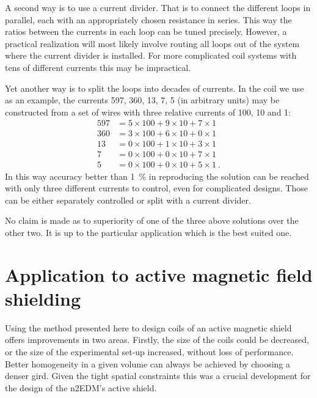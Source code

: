 A second way is to use a current divider. That is to connect the different loops in parallel, each with an appropriately chosen resistance in series. This way the ratios between the currents in each loop can be tuned precisely. However, a practical realization will most likely involve routing all loops out of the system where the current divider is installed. For more complicated coil systems with tens of different currents this may be impractical.

Yet another way is to split the loops into decades of currents.
In the coil we use as an example, the currents \num{597}, \num{360}, \num{13}, \num{7}, \num{5} (in arbitrary units) may be constructed from a set of wires with three relative currents of \num{100}, \num{10} and \num{1}:
\begin{align*}
  597 & = 5 \times 100 + 9 \times 10 + 7 \times 1 \\
  360 & = 3 \times 100 + 6 \times 10 + 0 \times 1 \\
  13 & = 0 \times 100 + 1 \times 10 + 3 \times 1 \\
  7 & = 0 \times 100 + 0 \times 10 + 7 \times 1 \\
  5 & = 0 \times 100 + 0 \times 10 + 5 \times 1 \ .
\end{align*}
In this way accuracy better than \SI{1}{\percent} in reproducing the solution can be reached with only three different currents to control, even for complicated designs. Those can be either separately controlled or split with a current divider.

No claim is made as to superiority of one of the three above solutions over the other two. It is up to the particular application which is the best suited one.




\section{Application to active magnetic field shielding}
Using the method presented here to design coils of an active magnetic shield  offers improvements in two areas. Firstly, the size of the coils could be decreased, or the size of the experimental set-up increased, without loss of performance. Better homogeneity in a given volume can always be achieved by choosing a denser gird. Given the tight spatial constraints this was a crucial development for the design of the n2EDM's active shield.

